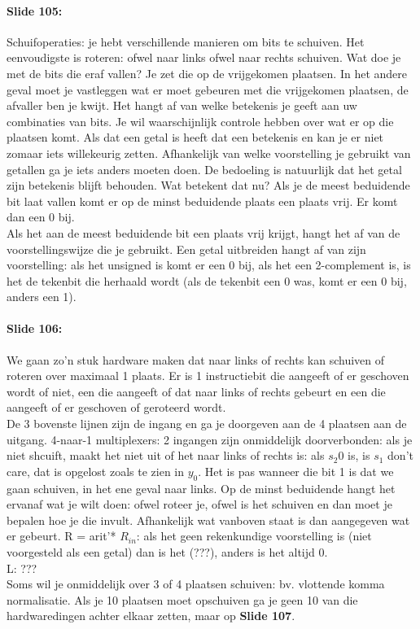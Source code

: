 \documentclass[10pt,a4paper]{book}
\begin{document}
\paragraph{Slide 105:} Schuifoperaties: je hebt verschillende manieren om bits te schuiven. Het eenvoudigste is roteren: ofwel naar links ofwel naar rechts schuiven. Wat doe je met de bits die eraf vallen? Je zet die op de vrijgekomen plaatsen. In het andere geval moet je vastleggen wat er moet gebeuren met die vrijgekomen plaatsen, de afvaller ben je kwijt. Het hangt af van welke betekenis je geeft aan uw combinaties van bits. Je wil waarschijnlijk controle hebben over wat er op die plaatsen komt. Als dat een getal is heeft dat een betekenis en kan je er niet zomaar iets willekeurig zetten. Afhankelijk van welke voorstelling je gebruikt van getallen ga je iets anders moeten doen. De bedoeling is natuurlijk dat het getal zijn betekenis blijft behouden. Wat betekent dat nu? Als je de meest beduidende bit laat vallen komt er op de minst beduidende plaats een plaats vrij. Er komt dan een 0 bij.\\
Als het aan de meest beduidende bit een plaats vrij krijgt, hangt het af van de voorstellingswijze die je gebruikt. Een getal uitbreiden hangt af van zijn voorstelling: als het unsigned is komt er een 0 bij, als het een 2-complement is, is het de tekenbit die herhaald wordt (als de tekenbit een 0 was, komt er een 0 bij, anders een 1).

\paragraph{Slide 106:} We gaan zo'n stuk hardware maken dat naar links of rechts kan schuiven of roteren over maximaal 1 plaats. Er is 1 instructiebit die aangeeft of er geschoven wordt of niet, een die aangeeft of dat naar links of rechts gebeurt en een die aangeeft of er geschoven of geroteerd wordt.\\
De 3 bovenste lijnen zijn de ingang en ga je doorgeven aan de 4 plaatsen aan de uitgang. 4-naar-1 multiplexers: 2 ingangen zijn onmiddelijk doorverbonden: als je niet shcuift, maakt het niet uit of het naar links of rechts is: als $s_2 $0 is, is $s_1$ don't care, dat is opgelost zoals te zien in $y_0$. Het is pas wanneer die bit 1 is dat we gaan schuiven, in het ene geval naar links. Op de minst beduidende hangt het ervanaf wat je wilt doen: ofwel roteer je, ofwel is het schuiven en dan moet je bepalen hoe je die invult. Afhankelijk wat vanboven staat is dan aangegeven wat er gebeurt. R = arit'* $R_{in}$: als het geen rekenkundige voorstelling is (niet voorgesteld als een getal) dan is het (???), anders is het altijd 0.\\
L: ???\\
Soms wil je onmiddelijk over 3 of 4 plaatsen schuiven: bv. vlottende komma normalisatie. Als je 10 plaatsen moet opschuiven ga je geen 10 van die hardwaredingen achter elkaar zetten, maar op \textbf{Slide 107}.
\end{document}
